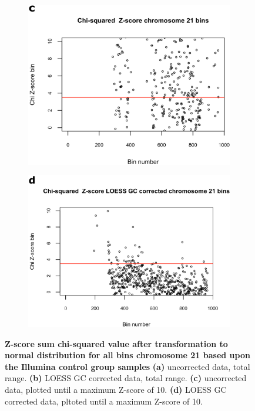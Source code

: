 \begin{figure}[!h]
\begin{subfigure}{.5\textwidth}
		\label{fig:NIPT_Supp1_Fig1_3b}
	\end{subfigure}
	\begin{subfigure}{.5\textwidth}
		\centering
		\includegraphics[width=1\linewidth]{img/NIPT_Supp1_Fig1_3c}
		\label{fig:NIPT_Supp1_Fig1_3c}
	\end{subfigure} 
	\begin{subfigure}{.5\textwidth}
		\centering
		\includegraphics[width=1\linewidth]{img/NIPT_Supp1_Fig1_3d}
		\label{fig:NIPT_Supp1_Fig1_3d}
	\end{subfigure}  
	\caption[Example Z-score normal distribution sum chi-squared value]{\textbf{Z-score sum chi-squared value after transformation to normal distribution for all bins chromosome 21 based upon the Illumina control group samples} \textbf{(a)} uncorrected data, total range. \textbf{(b)} LOESS GC corrected data, total range. \textbf{(c)} uncorrected data, plotted until a maximum Z-score of 10. \textbf{(d)} LOESS GC corrected data, pltoted until a maximum Z-score of 10.}
	\label{fig:NIPT_Supp1_Fig1_3}
\end{figure}

